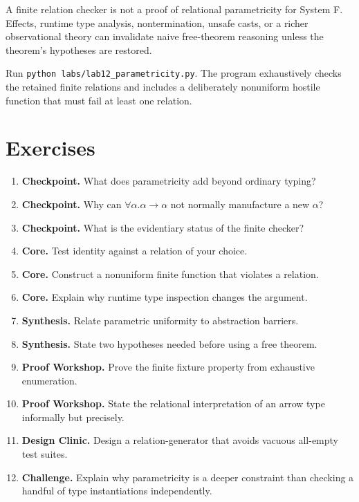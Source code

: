 

\begin{warningbox}
A finite relation checker is not a proof of relational parametricity for System F. Effects, runtime type analysis, nontermination, unsafe casts, or a richer observational theory can invalidate naive free-theorem reasoning unless the theorem's hypotheses are restored.
\end{warningbox}

\begin{labbox}
Run \texttt{python labs/lab12_parametricity.py}. The program exhaustively checks the retained finite relations and includes a deliberately nonuniform hostile function that must fail at least one relation.
\end{labbox}

\section*{Exercises}
\begin{enumerate}[label=\textbf{12.\arabic*.}]
\item \textbf{Checkpoint.} What does parametricity add beyond ordinary typing?
\item \textbf{Checkpoint.} Why can $\forall\alpha.\alpha\to\alpha$ not normally manufacture a new $\alpha$?
\item \textbf{Checkpoint.} What is the evidentiary status of the finite checker?
\item \textbf{Core.} Test identity against a relation of your choice.
\item \textbf{Core.} Construct a nonuniform finite function that violates a relation.
\item \textbf{Core.} Explain why runtime type inspection changes the argument.
\item \textbf{Synthesis.} Relate parametric uniformity to abstraction barriers.
\item \textbf{Synthesis.} State two hypotheses needed before using a free theorem.
\item \textbf{Proof Workshop.} Prove the finite fixture property from exhaustive enumeration.
\item \textbf{Proof Workshop.} State the relational interpretation of an arrow type informally but precisely.
\item \textbf{Design Clinic.} Design a relation-generator that avoids vacuous all-empty test suites.
\item \textbf{Challenge.} Explain why parametricity is a deeper constraint than checking a handful of type instantiations independently.
\end{enumerate}
